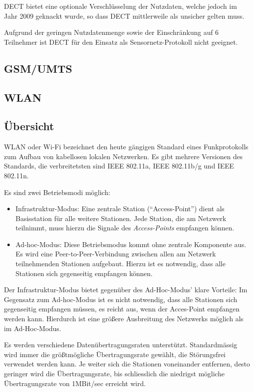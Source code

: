 DECT bietet eine optionale Verschlüsselung der Nutzdaten, welche jedoch im Jahr 2009 geknackt
wurde, so dass DECT mittlerweile als unsicher gelten muss.

Aufgrund der geringen Nutzdatenmenge sowie der Einschränkung auf 6 Teilnehmer ist
DECT für den Einsatz als Sensornetz-Protokoll nicht geeignet.

\subsection{GSM/UMTS}


\subsection{WLAN}\label{wlan}
\subsection{Übersicht}
WLAN oder Wi-Fi bezeichnet den heute gängigen Standard eines Funkprotokolls zum Aufbau
von kabellosen lokalen Netzwerken. Es gibt mehrere Versionen des Standards, die verbreitetsten
sind IEEE 802.11a, IEEE 802.11b/g und IEEE 802.11n. 

Es sind zwei Betriebsmodi möglich:

\begin{itemize}
    \item{Infrastruktur-Modus:} Eine zentrale Station ("`Access-Point"') dient als Basisstation
                                für alle weitere Stationen. Jede Station, die am Netzwerk
                                teilnimmt, muss hierzu die Signale des \textsl{Access-Points} 
                                empfangen können.
    \item{Ad-hoc-Modus:} Diese Betriebsmodus kommt ohne zentrale Komponente aus. Es wird eine
                         Peer-to-Peer-Verbindung zwischen allen am Netzwerk teilnehmenden 
                         Stationen aufgebaut. Hierzu ist es notwendig, dass alle Stationen
                         sich gegenseitig empfangen können.
\end{itemize}

Der Infrastruktur-Modus bietet gegenüber des Ad-Hoc-Modus' klare Vorteile: Im Gegensatz
zum Ad-hoc-Modus ist es nicht notwendig, dass alle Stationen sich gegenseitig empfangen
müssen, es reicht aus, wenn der Acces-Point empfangen werden kann. Hierdurch ist eine
größere Ausbreitung des Netzwerks möglich als im Ad-Hoc-Modus. 

Es werden verschiedene Datenübertragungsraten unterstützt. Standardmässig wird
immer die größtmögliche Übertragungsrate gewählt, die Störungsfrei verwendet
werden kann. Je weiter sich die Stationen voneinander entfernen, desto geringer
wird die Übertragungsrate, bis schliesslich die niedrigst mögliche Übertragungsrate von
1MBit/sec erreicht wird.

